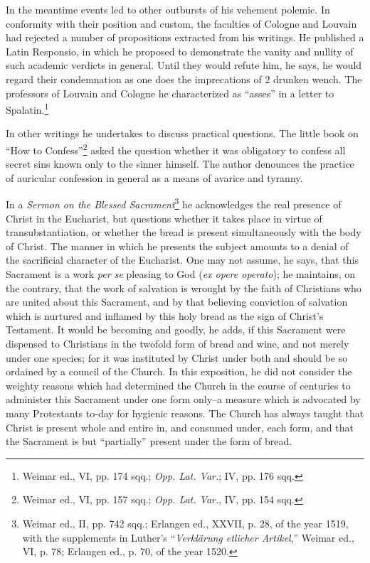 In the meantime events led to other outbursts of his vehement
polemic. In conformity with their position and custom, the faculties
of Cologne and Louvain had rejected a number of propositions extracted
from his writings. He published a Latin Responsio, in which
he proposed to demonstrate the vanity and nullity of such academic
verdicts in general. Until they would refute him, he says, he would
regard their condemnation as one does the imprecations of 2 drunken
wench. The professors of Louvain and Cologne he characterized as
“asses” in a letter to Spalatin.\footnote{Weimar ed., VI, pp. 174 sqq.; \textit{Opp. Lat. Var.}; IV, pp. 176 sqq.}

In other writings he undertakes to discuss practical questions. The
little book on “How to Confess”\footnote{Weimar ed., VI, pp. 157 sqq.; \textit{Opp. Lat. Var.}, IV, pp. 154 sqq.}
asked the question whether it
was obligatory to confess all secret sins known only to the sinner
himself. The author denounces the practice of auricular confession
in general as a means of avarice and tyranny.

In a \textit{Sermon on the Blessed Sacrament}\footnote
{Weimar ed., II, pp. 742 sqq.; Erlangen ed., XXVII, p. 28, of the year 1519, with
the supplements in Luther’s “\textit{Verklärung etlicher Artikel},” Weimar ed., VI, p. 78;
Erlangen ed., p. 70, of the year 1520.}
he acknowledges the real
presence of Christ in the Eucharist, but questions whether it takes
place in virtue of transubstantiation, or whether the bread is present
simultaneously with the body of Christ. The manner in which he presents
the subject amounts to a denial of the sacrificial character of
the Eucharist. One may not assume, he says, that this Sacrament
is a work \textit{per se} pleasing to God (\textit{ex opere operato}); he maintains,
on the contrary, that the work of salvation is wrought by the faith
of Christians who are united about this Sacrament, and by that believing
conviction of salvation which is nurtured and inflamed by
this holy bread as the sign of Christ’s Testament. It would be becoming
and goodly, he adds, if this Sacrament were dispensed to
Christians in the twofold form of bread and wine, and not merely
under one species; for it was instituted by Christ under both and
should be so ordained by a council of the Church. In this exposition,
he did not consider the weighty reasons which had determined the
Church in the course of centuries to administer this Sacrament under
one form only--a measure which is advocated by many Protestants
to-day for hygienic reasons. The Church has always taught that
Christ is present whole and entire in, and consumed under, each form,
and that the Sacrament is but “partially” present under the form
of bread.

